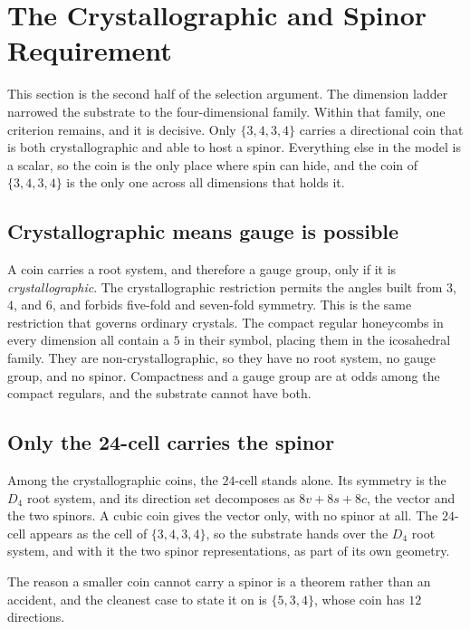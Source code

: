 \section{The Crystallographic and Spinor Requirement}

This section is the second half of the selection argument. The dimension ladder narrowed the substrate to the
four-dimensional family. Within that family, one criterion remains, and it is decisive. Only $\{3,4,3,4\}$
carries a directional coin that is both crystallographic and able to host a spinor. Everything else in the model
is a scalar, so the coin is the only place where spin can hide, and the coin of $\{3,4,3,4\}$ is the only one
across all dimensions that holds it.

\subsection{Crystallographic means gauge is possible}

A coin carries a root system, and therefore a gauge group, only if it is \emph{crystallographic}. The
crystallographic restriction permits the angles built from $3$, $4$, and $6$, and forbids five-fold and
seven-fold symmetry. This is the same restriction that governs ordinary crystals. The compact regular honeycombs
in every dimension all contain a $5$ in their symbol, placing them in the icosahedral family. They are
non-crystallographic, so they have no root system, no gauge group, and no spinor. Compactness and a gauge group
are at odds among the compact regulars, and the substrate cannot have both.

\subsection{Only the 24-cell carries the spinor}

Among the crystallographic coins, the $24$-cell stands alone. Its symmetry is the $D_4$ root system, and its
direction set decomposes as $8v + 8s + 8c$, the vector and the two spinors. A cubic coin gives the vector only,
with no spinor at all. The $24$-cell appears as the cell of $\{3,4,3,4\}$, so the substrate hands over the $D_4$
root system, and with it the two spinor representations, as part of its own geometry.

The reason a smaller coin cannot carry a spinor is a theorem rather than an accident, and the cleanest case to
state it on is $\{5,3,4\}$, whose coin has $12$ directions.

